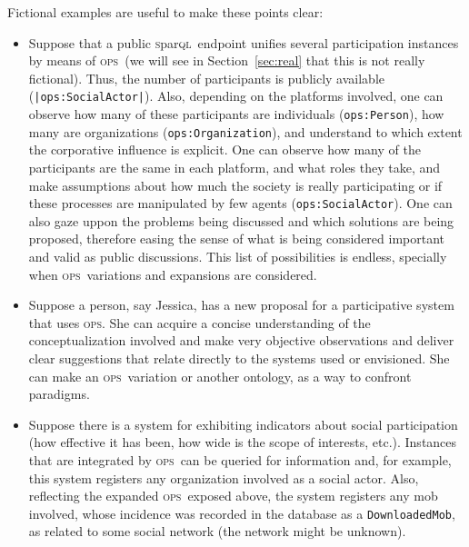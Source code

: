 \documentclass[10pt,letterpaper]{article}
\newcommand{\ops}{\textsc{ops}}
\newcommand{\sparql}{\textsc{s}par\textsc{ql}}
\begin{document}
Fictional examples are useful to make these points clear:
\begin{itemize}
    \item Suppose that a public \sparql\ endpoint unifies several participation instances by means of \ops\ (we will see in Section~\ref{sec:real} that this is not really fictional). Thus, the number of participants is publicly available ({\tt |ops:SocialActor|}). Also, depending on the platforms involved, one can observe how many of these participants are individuals ({\tt ops:Person}), how many are organizations ({\tt ops:Organization}), and understand to which extent the corporative influence is explicit. One can observe how many of the participants are the same in each platform, and what roles they take, and make assumptions about how much the society is really participating or if these processes are manipulated by few agents ({\tt ops:SocialActor}). One can also gaze uppon the problems being discussed and which solutions are being proposed, therefore easing the sense of what is being considered important and valid as public discussions. This list of possibilities is endless, specially when \ops\ variations and expansions are considered.
    \item Suppose a person, say Jessica, has a new proposal for a participative system that uses \ops. She can acquire a concise understanding of the conceptualization involved and make very objective observations and deliver clear suggestions that relate directly to the systems used or envisioned. She can make an \ops\ variation or another ontology, as a way to confront paradigms.
    \item Suppose there is a system for exhibiting indicators about social participation (how effective it has been, how wide is the scope of interests, etc.). Instances that are integrated by \ops\ can be queried for information and, for example, this system registers any organization involved as a social actor. Also, reflecting the expanded \ops\ exposed above, the system registers any mob involved, whose incidence was recorded in the database as a \texttt{DownloadedMob}, as related to some social network (the network might be unknown).
\end{itemize}
\end{document}
